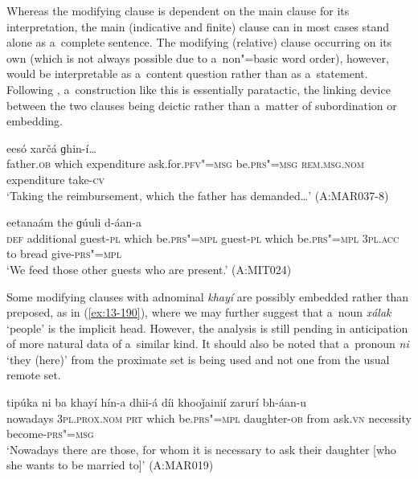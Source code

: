 Whereas the modifying clause is dependent on the main clause for its interpretation, the main (indicative and finite) clause can in most cases stand alone as a~complete sentence. The modifying (relative) clause occurring on its own (which is not always possible due to a~non"=basic word order), however, would be interpretable as a~content question rather than as a~statement. Following \citet[182]{givon2001b}, a~construction like this is essentially paratactic, the linking device between the two clauses being deictic rather than a~matter of subordination or embedding.

\begin{exe}
\ex
\label{ex:13-188}
  eesó xarčá ɡhin-í{\ldots}  \\
father.\textsc{ob} which expenditure ask.for.\textsc{pfv"=msg} be.\textsc{prs"=msg} \textsc{rem.msg.nom} expenditure take-\textsc{cv} \\
\glt `Taking the reimbursement, which the father has demanded{\ldots}' (A:MAR037-8)

\ex
\label{ex:13-189}
eetanaám the ɡúuli d-áan-a \\
\textsc{def} additional guest-\textsc{pl} which be.\textsc{prs"=mpl} guest-\textsc{pl} which be.\textsc{prs"=mpl} \textsc{3pl.acc} to bread give-\textsc{prs"=mpl} \\
\glt `We feed those other guests who are present.' (A:MIT024) 
\end{exe}

Some modifying clauses with adnominal \textit{khayí} are possibly embedded rather than preposed, as in (\ref{ex:13-190}), where we may further suggest that a~noun \textit{xálak} `people' is the implicit head. However, the analysis is still pending in anticipation of more natural data of a~similar kind. It should also be noted that a~pronoun \textit{ni} `they (here)' from the proximate set is being used and not one from the usual remote set.

\begin{exe}
\ex
\label{ex:13-190}
\gll tipúka ni ba khayí hín-a  dhii-á díi khooǰainií zarurí bh-áan-u \\
nowadays \textsc{3pl.prox.nom} \textsc{prt} which be.\textsc{prs"=mpl}  daughter-\textsc{ob} from ask.\textsc{vn} necessity become-\textsc{prs"=msg} \\
\glt `Nowadays there are those, for whom it is necessary to ask their daughter [who she wants to be married to]' (A:MAR019) 
\end{exe}

